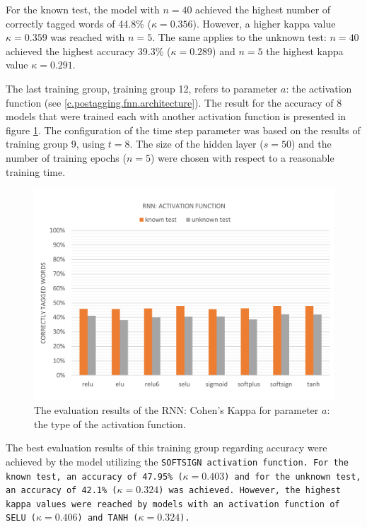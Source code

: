 For the known test, the model with $n=40$ achieved the highest number of correctly tagged words of 44.8\% ($\kappa=0.356$). However, a higher kappa value $\kappa=0.359$ was reached with $n=5$. The same applies to the unknown test: $n=40$ achieved the highest accuracy 39.3\% ($\kappa=0.289$) and $n=5$ the highest kappa value $\kappa=0.291$.

The last training group, \b{training group 12}, refers to parameter $a$: the activation function (see \ref{c.postagging.fnn.architecture}). The result for the accuracy of 8 models that were trained each with another activation function is presented in figure \ref{f.evaluation.rnn.a}. The configuration of the time step parameter was based on the results of training group 9, using $t=8$. The size of the hidden layer ($s=50$) and the number of training epochs ($n=5$) were chosen with respect to a reasonable training time.

\begin{figure}[H]
	\hspace{-5mm}\includegraphics[width=1.07\textwidth]{images/evaluation_rnn_a}
	\caption[RNN Evaluation: Activation Function]{The evaluation results of the RNN: Cohen's Kappa for parameter $a$: the type of the activation function.}
	\label{f.evaluation.rnn.a}
\end{figure}

The best evaluation results of this training group regarding accuracy were achieved by the model utilizing the \tt{SOFTSIGN} activation function. For the known test, an accuracy of 47.95\% ($\kappa=0.403$) and for the unknown test, an accuracy of 42.1\% ($\kappa=0.324$) was achieved. However, the highest kappa values were reached by models with an activation function of \tt{SELU} ($\kappa=0.406$) and \tt{TANH} ($\kappa=0.324$).

